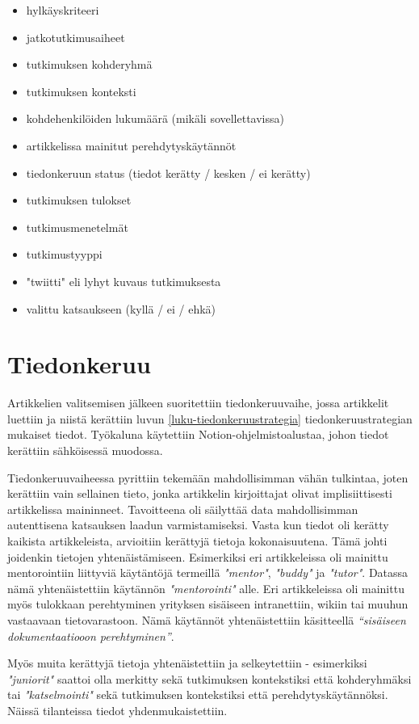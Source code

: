 \documentclass[utf8]{gradu3}
\begin{document}
\begin{itemize}
    \item hylkäyskriteeri
    \item jatkotutkimusaiheet
    \item tutkimuksen kohderyhmä
    \item tutkimuksen konteksti
    \item kohdehenkilöiden lukumäärä (mikäli sovellettavissa)
    \item artikkelissa mainitut perehdytyskäytännöt
    \item tiedonkeruun status (tiedot kerätty / kesken / ei kerätty)
    \item tutkimuksen tulokset
    \item tutkimusmenetelmät
    \item tutkimustyyppi
    \item "twiitti" eli lyhyt kuvaus tutkimuksesta
    \item valittu katsaukseen (kyllä / ei / ehkä)
\end{itemize}

\section{Tiedonkeruu}

Artikkelien valitsemisen jälkeen suoritettiin tiedonkeruuvaihe, jossa artikkelit luettiin ja niistä kerättiin luvun \ref{luku-tiedonkeruustrategia} tiedonkeruustrategian mukaiset tiedot. Työkaluna käytettiin Notion-ohjelmistoalustaa, johon tiedot kerättiin sähköisessä muodossa. 

Tiedonkeruuvaiheessa pyrittiin tekemään mahdollisimman vähän tulkintaa, joten kerättiin vain sellainen tieto, jonka artikkelin kirjoittajat olivat implisiittisesti artikkelissa maininneet. Tavoitteena oli säilyttää data mahdollisimman autenttisena katsauksen laadun varmistamiseksi. Vasta kun tiedot oli kerätty kaikista artikkeleista, arvioitiin kerättyjä tietoja kokonaisuutena. Tämä johti joidenkin tietojen yhtenäistämiseen. Esimerkiksi eri artikkeleissa oli mainittu mentorointiin liittyviä käytäntöjä termeillä \textit{"mentor"}, \textit{"buddy"} ja \textit{"tutor"}. Datassa nämä yhtenäistettiin käytännön \textit{"mentorointi"} alle. Eri artikkeleissa oli mainittu myös tulokkaan perehtyminen yrityksen sisäiseen intranettiin, wikiin tai muuhun vastaavaan tietovarastoon. Nämä käytännöt yhtenäistettiin käsitteellä \textit{“sisäiseen dokumentaatiooon perehtyminen”}.

Myös muita kerättyjä tietoja yhtenäistettiin ja selkeytettiin - esimerkiksi \textit{"juniorit"} saattoi olla merkitty sekä tutkimuksen kontekstiksi että kohderyhmäksi tai \textit{"katselmointi"} sekä tutkimuksen kontekstiksi että perehdytyskäytännöksi. Näissä tilanteissa tiedot yhdenmukaistettiin.
\end{document}
